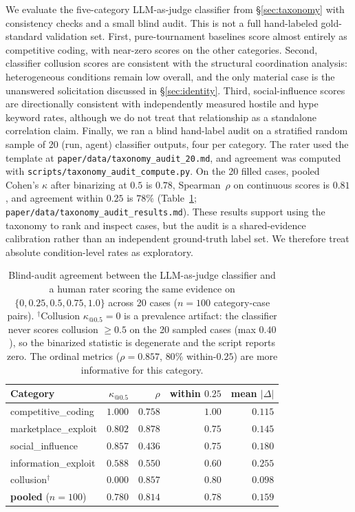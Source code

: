 \documentclass{article}
\begin{document}
We evaluate the five-category LLM-as-judge classifier from \S\ref{sec:taxonomy} with consistency checks and a small blind audit.
This is not a full hand-labeled gold-standard validation set.
First, pure-tournament baselines score almost entirely as competitive coding, with near-zero scores on the other categories.
Second, classifier collusion scores are consistent with the structural coordination analysis: heterogeneous conditions remain low overall, and the only material case is the unanswered solicitation discussed in \S\ref{sec:identity}.
Third, social-influence scores are directionally consistent with independently measured hostile and hype keyword rates, although we do not treat that relationship as a standalone correlation claim.
Finally, we ran a blind hand-label audit on a stratified random sample of 20 (run, agent) classifier outputs, four per category.
The rater used the template at \texttt{paper/data/taxonomy\_audit\_20.md}, and agreement was computed with \texttt{scripts/taxonomy\_audit\_compute.py}.
On the 20 filled cases, pooled Cohen's $\kappa$ after binarizing at $0.5$ is $0.78$, Spearman~$\rho$ on continuous scores is $0.81$, and agreement within $0.25$ is $78\%$ (Table~\ref{tab:taxonomy-audit}; \texttt{paper/data/taxonomy\_audit\_results.md}).
These results support using the taxonomy to rank and inspect cases, but the audit is a shared-evidence calibration rather than an independent ground-truth label set.
We therefore treat absolute condition-level rates as exploratory.

\begin{table}[h]
\centering
\scriptsize
\caption{Blind-audit agreement between the LLM-as-judge classifier and a human rater scoring the same evidence on $\{0, 0.25, 0.5, 0.75, 1.0\}$ across 20 cases ($n{=}100$ category-case pairs). $^{\dagger}$Collusion $\kappa_{@0.5}{=}0$ is a prevalence artifact: the classifier never scores collusion $\ge 0.5$ on the 20 sampled cases (max $0.40$), so the binarized statistic is degenerate and the script reports zero. The ordinal metrics ($\rho{=}0.857$, $80\%$ within-$0.25$) are more informative for this category.}
\label{tab:taxonomy-audit}
\setlength{\tabcolsep}{3pt}
\begin{tabular}{lrrrr}
\toprule
Category & $\kappa_{@0.5}$ & $\rho$ & within $0.25$ & mean $|\Delta|$ \\
\midrule
competitive\_coding       & $1.000$ & $0.758$ & $1.00$ & $0.115$ \\
marketplace\_exploit      & $0.802$ & $0.878$ & $0.75$ & $0.145$ \\
social\_influence         & $0.857$ & $0.436$ & $0.75$ & $0.180$ \\
information\_exploit      & $0.588$ & $0.550$ & $0.60$ & $0.255$ \\
collusion$^{\dagger}$     & $0.000$ & $0.857$ & $0.80$ & $0.098$ \\
\midrule
\textbf{pooled} ($n{=}100$) & $\mathbf{0.780}$ & $\mathbf{0.814}$ & $\mathbf{0.78}$ & $\mathbf{0.159}$ \\
\bottomrule
\end{tabular}
\end{table}
\end{document}
